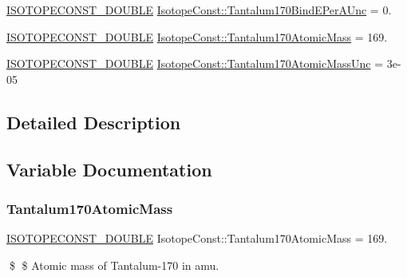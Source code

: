 \begin{DoxyCompactItemize}
\mbox{\hyperlink{group___isotope_const-_macros_ga8f45a7272ce02c0b4c65c44636ed719a}{I\+S\+O\+T\+O\+P\+E\+C\+O\+N\+S\+T\+\_\+\+D\+O\+U\+B\+LE}} \mbox{\hyperlink{group___isotope_const-_tantalum-_ta170_ga915a5e30d38ddfbfb1c84648b6e57900}{Isotope\+Const\+::\+Tantalum170\+Bind\+E\+Per\+A\+Unc}} = 0.
\item 
\mbox{\hyperlink{group___isotope_const-_macros_ga8f45a7272ce02c0b4c65c44636ed719a}{I\+S\+O\+T\+O\+P\+E\+C\+O\+N\+S\+T\+\_\+\+D\+O\+U\+B\+LE}} \mbox{\hyperlink{group___isotope_const-_tantalum-_ta170_ga982676927ee98d56846b3c35c638e5e2}{Isotope\+Const\+::\+Tantalum170\+Atomic\+Mass}} = 169.
\item 
\mbox{\hyperlink{group___isotope_const-_macros_ga8f45a7272ce02c0b4c65c44636ed719a}{I\+S\+O\+T\+O\+P\+E\+C\+O\+N\+S\+T\+\_\+\+D\+O\+U\+B\+LE}} \mbox{\hyperlink{group___isotope_const-_tantalum-_ta170_ga3bac326f66d202986895fa332ee8699e}{Isotope\+Const\+::\+Tantalum170\+Atomic\+Mass\+Unc}} = 3e-\/05
\end{DoxyCompactItemize}


\subsection{Detailed Description}


\subsection{Variable Documentation}
\mbox{\label{group___isotope_const-_tantalum-_ta170_ga982676927ee98d56846b3c35c638e5e2}} 
\subsubsection{\texorpdfstring{Tantalum170\+Atomic\+Mass}{Tantalum170AtomicMass}}
{\footnotesize\ttfamily \mbox{\hyperlink{group___isotope_const-_macros_ga8f45a7272ce02c0b4c65c44636ed719a}{I\+S\+O\+T\+O\+P\+E\+C\+O\+N\+S\+T\+\_\+\+D\+O\+U\+B\+LE}} Isotope\+Const\+::\+Tantalum170\+Atomic\+Mass = 169.}

\$ \$ Atomic mass of Tantalum-\/170 in amu. \mbox{\label{group___isotope_const-_tantalum-_ta170_ga3bac326f66d202986895fa332ee8699e}} 
